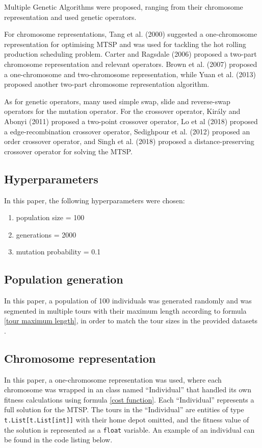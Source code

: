 \documentclass[conference]{IEEEtran}
\begin{document}
Multiple Genetic Algorithms were proposed, ranging from their chromosome representation and used genetic operators.

For chromosome representations, Tang et al. (2000) suggested a one-chromosome representation for optimising MTSP and was
used for tackling the hot rolling production scheduling problem. Carter and Ragsdale (2006) proposed a two-part chromosome
representation and relevant operators. Brown et al. (2007) proposed a one-chromosome and two-chromosome representation, while
Yuan et al. (2013) proposed another two-part chromosome representation algorithm.

As for genetic operators, many used simple swap, slide and reverse-swap operators for the mutation operator. For the crossover
operator, Király and Abonyi (2011) proposed a two-point crossover operator, Lo et al (2018) proposed a edge-recombination crossover
operator, Sedighpour et al. (2012) proposed an order crossover operator, and Singh et al. (2018) proposed a distance-preserving
crossover operator for solving the MTSP.

\subsection{Hyperparameters}
In this paper, the following hyperparameters were chosen:
\begin{enumerate}
    \item population size = 100
    \item generations = 2000
    \item mutation probability = 0.1
\end{enumerate}

\subsection{Population generation} \label{Genetic algorithm population generation}
In this paper, a population of 100 individuals was generated randomly and was segmented in multiple tours with their maximum
length according to formula \ref{tour maximum length}, in order to match the tour sizes in the provided datasets \cite{b5}.

\subsection{Chromosome representation}
In this paper, a one-chromosome representation was used, where each chromosome was wrapped in an class named ``Individual''
that handled its own fitness calculations using formula \ref{cost function}. Each ``Individual'' represents a full solution
for the MTSP. The tours in the ``Individual'' are entities of type \texttt{t.List[t.List[int]]} with their home depot omitted,
and the fitness value of the solution is represented as a \texttt{float} variable. An example of an individual can be found
in the code listing below.
\end{document}
